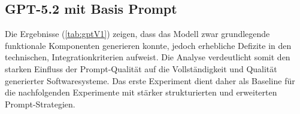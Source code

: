 \subsection{GPT-5.2 mit Basis Prompt}
Die Ergebnisse (\ref{tab:gptV1}) zeigen, dass das Modell zwar grundlegende funktionale Komponenten generieren konnte, jedoch erhebliche Defizite in den technischen, Integrationkriterien aufweist. Die Analyse verdeutlicht somit den starken Einfluss der Prompt-Qualität auf die Vollständigkeit und Qualität generierter Softwaresysteme. Das erste Experiment dient daher als Baseline für die nachfolgenden Experimente mit stärker strukturierten und erweiterten Prompt-Strategien.

\newpage
\begin{table}[H]
\centering
\small
\caption{Ergebnisse von GPT-5.2 mit Basis Prompt} 
\label{tab:gptV1} 


\end{table}
